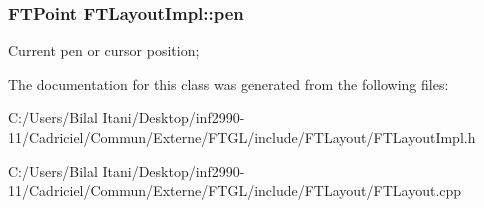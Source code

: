 \subsubsection[{\texorpdfstring{pen}{pen}}]{\setlength{\rightskip}{0pt plus 5cm}F\+T\+Point F\+T\+Layout\+Impl\+::pen\hspace{0.3cm}{\ttfamily [protected]}}\hypertarget{class_f_t_layout_impl_aefaff875c0cf4fe5710897f614be44ac}{}\label{class_f_t_layout_impl_aefaff875c0cf4fe5710897f614be44ac}
Current pen or cursor position; 

The documentation for this class was generated from the following files\+:\begin{DoxyCompactItemize}
\item 
C\+:/\+Users/\+Bilal Itani/\+Desktop/inf2990-\/11/\+Cadriciel/\+Commun/\+Externe/\+F\+T\+G\+L/include/\+F\+T\+Layout/F\+T\+Layout\+Impl.\+h\item 
C\+:/\+Users/\+Bilal Itani/\+Desktop/inf2990-\/11/\+Cadriciel/\+Commun/\+Externe/\+F\+T\+G\+L/include/\+F\+T\+Layout/F\+T\+Layout.\+cpp\end{DoxyCompactItemize}
